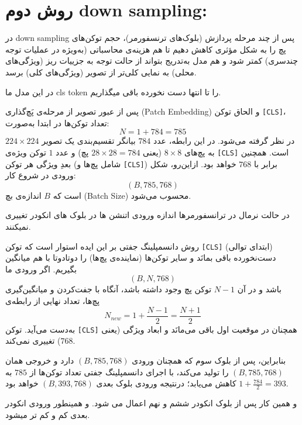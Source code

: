 \section{روش دوم down sampling: }


در  down sampling  پس از چند مرحله پردازش (بلوک‌های ترنسفورمر)، حجم توکن‌های پچ را به شکل مؤثری کاهش دهیم تا هم هزینه‌ی محاسباتی (به‌ویژه در عملیات توجه چندسری) کمتر شود و هم مدل به‌تدریج بتواند از حالت توجه به جزییات ریز (ویژگی‌های محلی) به نمایی کلی‌تر از تصویر (ویژگی‌های کلی) برسد.

در این مدل ما cls token  را تا انتها دست نخورده باقی میگذاریم.

پس از عبور تصویر از مرحله‌ی پَچ‌گذاری (Patch Embedding) و الحاق توکن \texttt{[CLS]}، تعداد توکن‌ها در ابتدا به‌صورت:
\begin{equation}
	N = 1 + 784 = 785
\end{equation}
در نظر گرفته می‌شود. در این رابطه، عدد $784$ بیانگر تقسیم‌بندی یک تصویر $224 \times 224$ به پچ‌های $8 \times 8$ (یعنی $28 \times 28 = 784$ پچ) و عدد $1$ توکن ویژه‌ی \texttt{[CLS]} است. همچنین بعدِ ویژگی هر توکن (شامل پچ‌ها و \texttt{[CLS]}) برابر با $768$ خواهد بود. ازاین‌رو، شکل ورودی در شروع کار:
\begin{equation}
	(B, 785, 768)
\end{equation}
است که $B$ اندازه‌ی بچ (Batch Size) محسوب می‌شود.

در حالت نرمال در ترانسفورمرها اندازه ورودی اتنشن ها در بلوک های انکودر تغییری نمیکنند.


روش دانسمپلینگ جفتی بر این ایده استوار است که توکن \texttt{[CLS]} (ابتدای توالی) دست‌نخورده باقی بمانَد و سایر توکن‌ها (نماینده‌ی پچ‌ها) را دوتادوتا با هم میانگین بگیریم. اگر ورودی ما 
\begin{equation}
	(B, N, 768)
\end{equation}
باشد و در آن $N - 1$ توکن پچ وجود داشته باشد، آنگاه با جفت‌کردن و میانگین‌گیری پچ‌ها، تعداد نهایی از رابطه‌ی
\begin{equation}
	N_{new} = 1 + \frac{N - 1}{2} = \frac{N + 1}{2}
\end{equation}
به‌دست می‌آید. توکن \texttt{[CLS]} همچنان در موقعیت اول باقی می‌مانَد و ابعاد ویژگی (یعنی $768$) تغییری نمی‌کند.

بنابراین، پس از بلوک سوم که همچنان ورودی $(B, 785, 768)$ دارد و خروجی همان $(B, 785, 768)$ را تولید می‌کند، با اجرای دانسمپلینگ جفتی تعداد توکن‌ها از $785$ به $1 + \frac{784}{2} = 393$ کاهش می‌یابد؛ درنتیجه ورودی بلوک بعدی $(B, 393, 768)$ خواهد بود.

 
و همین کار پس از بلوک انکودر ششم و نهم اعمال می شود.  و همینطور ورودی انکودر بعدی کم و کم تر میشود.


